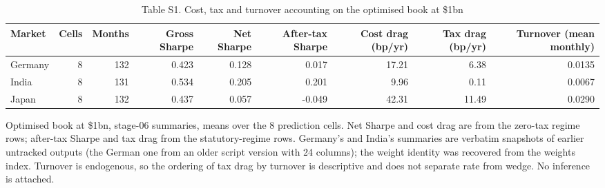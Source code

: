 \begin{table}[t]
\centering
\small
\caption{Table S1. Cost, tax and turnover accounting on the optimised book at \$1bn}
\label{tab:s1}
\begin{tabular}{lrrrrrrrr}
\toprule
Market & Cells & Months & Gross Sharpe & Net Sharpe & After-tax Sharpe & Cost drag (bp/yr) & Tax drag (bp/yr) & Turnover (mean monthly) \\
\midrule
Germany & 8 & 132 & 0.423 & 0.128 & 0.017 & 17.21 & 6.38 & 0.0135 \\
India & 8 & 131 & 0.534 & 0.205 & 0.201 & 9.96 & 0.11 & 0.0067 \\
Japan & 8 & 132 & 0.437 & 0.057 & -0.049 & 42.31 & 11.49 & 0.0290 \\
\bottomrule
\end{tabular}
\par\vspace{2pt}
\parbox{\textwidth}{\footnotesize Optimised book at \$1bn, stage-06 summaries, means over the 8 prediction cells. Net Sharpe and cost drag are from the zero-tax regime rows; after-tax Sharpe and tax drag from the statutory-regime rows. Germany's and India's summaries are verbatim snapshots of earlier untracked outputs (the German one from an older script version with 24 columns); the weight identity was recovered from the weights index. Turnover is endogenous, so the ordering of tax drag by turnover is descriptive and does not separate rate from wedge. No inference is attached.}
\end{table}
